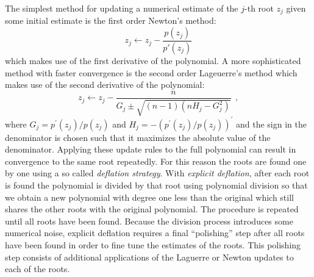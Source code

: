 \documentclass[12pt,dvipsnames]{report}
\newcommand{\hquad}{~~}
\begin{document}
The simplest method for updating a numerical estimate  of the $j$-th root $z_j$ given 
some initial estimate is the first order Newton's method:
\begin{equation}
    z_j \leftarrow z_j - \frac{p(z_j)}{p'(z_j)}
\end{equation}
which makes use of the first derivative of the polynomial.
A more sophisticated method with faster convergence is the second order Lageuerre's method
which makes use of the second derivative of the polynomial:
\begin{equation}
    z_j\leftarrow z_j - \frac{n}{G_{j} \pm \sqrt{(n-1)\left(n H_{j}-G_{j}^{2}\right)}}\hquad ,
    \label{eq:laguerre_update}
\end{equation}
where $G_j=p^\prime (z_j)/p(z_j)$ and $H_j=-(p^\prime (z_j)/p(z_j))^\prime$ and the sign
in the denominator is chosen such that it maximizes the absolute value of the denominator.
Applying these update rules to the full polynomial can result in convergence to the same 
root repeatedly. For this reason the roots are found  one by one using a so 
called \emph{deflation strategy}. With \emph{explicit deflation}, after 
each root is found the polynomial is divided by that root using polynomial division so 
that we  obtain a new  polynomial with degree one less than the original which still 
shares the other roots with the original polynomial.
The procedure is repeated until all roots have been found. Because the division
process introduces some numerical noise, explicit deflation requires a final ``polishing''
step after all roots have been found in order to fine tune the estimates of the roots. This 
polishing step  consists of additional applications of the Laguerre or Newton updates to 
each of the roots.
\end{document}
